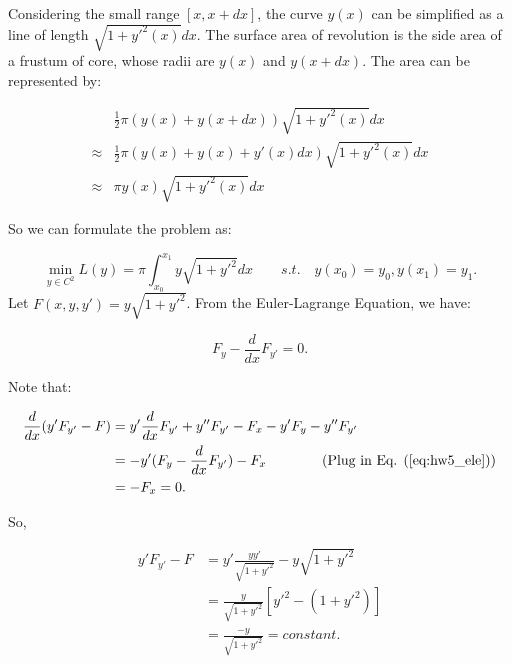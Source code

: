 \documentclass[
  course = {{16-811 Math Fundamentals for Robotics}},
  quartile = {{1}},
  assignment = 5,
  name = {{Kangle Deng}},
  email = {{kangled@andrew.cmu.edu}},
  firstexercise = 1
]{aga-homework}
\begin{document}
\exercise

Considering the small range $[x, x+dx]$, the curve $y(x)$ can be simplified as a line of length $\sqrt{1+y'^2(x)}dx$. The surface area of revolution is the side area of a frustum of core, whose radii are $y(x)$ and $y(x+dx)$. The area can be represented by:

\begin{equation*}
\begin{aligned}
      & \frac{1}{2}\pi (y(x)+y(x+dx)) \sqrt{1+y'^2(x)}dx \\ \approx & \frac{1}{2}\pi (y(x)+y(x)+y'(x)dx) \sqrt{1+y'^2(x)}dx
      \\ \approx & \pi y(x) \sqrt{1+y'^2(x)}dx
\end{aligned}
\end{equation*}

So we can formulate the problem as:

\begin{equation*}
    \min \limits_{y \in C^2} L(y) = \pi \int_{x_0}^{x_1} y \sqrt{1+y'^2}dx \qquad s.t. \quad y(x_0) = y_0,  y(x_1) = y_1.
\end{equation*}
Let $F(x,y,y') = y \sqrt{1+y'^2}$. From the Euler-Lagrange Equation, we have:

\begin{equation}
    F_y - \frac{d}{dx}F_{y'} = 0.
    \label{eq:hw5_ele}
\end{equation}

Note that:

\begin{equation*}
    \begin{aligned}
          \frac{d}{dx}(y'F_{y'}-F) & = y'\frac{d}{dx}F_{y'} + y''F_{y'
          } - F_x - y'F_y - y''F_{y'} \\
          & = -y'(F_y - \frac{d}{dx}F_{y'}) - F_x \qquad \qquad \text{(Plug in Eq. (\ref{eq:hw5_ele}))} \\
          & = -F_x = 0.
    \end{aligned}
\end{equation*}

So, 

\begin{equation*}
\begin{aligned}
  y'F_{y'}-F & = y'\frac{yy'}{\sqrt{1+y'^2}} - y \sqrt{1+y'^2} \\
  & = \frac{y}{\sqrt{1+y'^2}}[y'^2 - (1+y'^2)] \\
  & = \frac{-y}{\sqrt{1+y'^2}} = constant.
\end{aligned}

\end{equation*}
\end{document}
